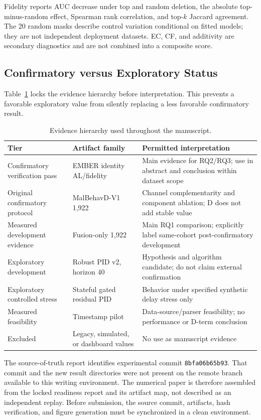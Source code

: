 Fidelity reports AUC decrease under top and random deletion, the absolute
top-minus-random effect, Spearman rank correlation, and top-$k$ Jaccard
agreement. The 20 random masks describe control variation conditional on fitted
models; they are not independent deployment datasets. EC, CF, and additivity are
secondary diagnostics and are not combined into a composite score.

\subsection{Confirmatory versus Exploratory Status}

Table~\ref{tab:evidence-tier} locks the evidence hierarchy before interpretation.
This prevents a favorable exploratory value from silently replacing a less
favorable confirmatory result.

\begin{table}[t]
\centering
\caption{Evidence hierarchy used throughout the manuscript.}
\label{tab:evidence-tier}
\scriptsize
\begin{tabular}{p{3.2cm}p{3.8cm}p{7.8cm}}
\toprule
Tier & Artifact family & Permitted interpretation \\
\midrule
Confirmatory verification pass & EMBER identity AL/fidelity & Main evidence for RQ2/RQ3; use in abstract and conclusion within dataset scope \\
Original confirmatory protocol & MalBehavD-V1 1,922 & Channel complementarity and component ablation; D does not add stable value \\
Measured development evidence & Fusion-only 1,922 & Main RQ1 comparison; explicitly label same-cohort post-confirmatory development \\
Exploratory development & Robust PID v2, horizon 40 & Hypothesis and algorithm candidate; do not claim external confirmation \\
Exploratory controlled stress & Stateful gated residual PID & Behavior under specified synthetic delay stress only \\
Measured feasibility & Timestamp pilot & Data-source/parser feasibility; no performance or D-term conclusion \\
Excluded & Legacy, simulated, or dashboard values & No use as manuscript evidence \\
\bottomrule
\end{tabular}
\end{table}

The source-of-truth report identifies experimental commit
\texttt{8bfa06b65b93}. That commit and the new result directories were not present
on the remote branch available to this writing environment. The numerical paper
is therefore assembled from the locked readiness report and its artifact map,
not described as an independent replay. Before submission, the source commit,
artifacts, hash verification, and figure generation must be synchronized in a
clean environment.
